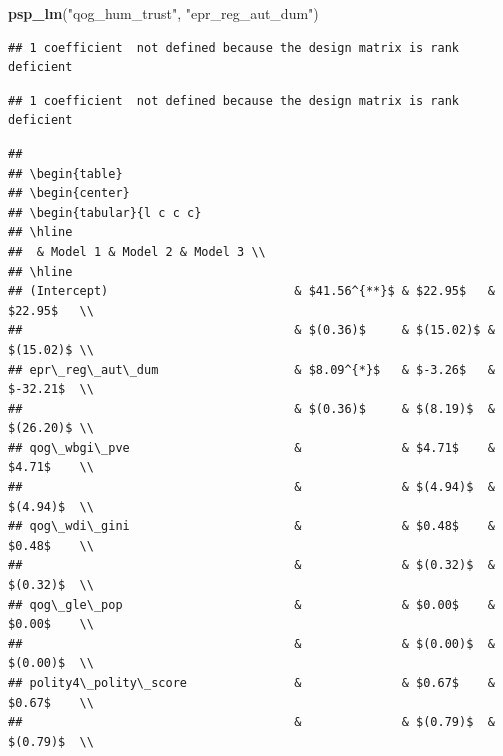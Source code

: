 \documentclass[
]{article}
\newenvironment{Shaded}{\begin{snugshade}}{\end{snugshade}}
\newcommand{\KeywordTok}[1]{\textcolor[rgb]{0.13,0.29,0.53}{\textbf{#1}}}
\newcommand{\NormalTok}[1]{#1}
\newcommand{\StringTok}[1]{\textcolor[rgb]{0.31,0.60,0.02}{#1}}
\begin{document}
\begin{Shaded}
\begin{Highlighting}[]
\KeywordTok{psp_lm}\NormalTok{(}\StringTok{"qog_hum_trust"}\NormalTok{, }\StringTok{"epr_reg_aut_dum"}\NormalTok{)}
\end{Highlighting}
\end{Shaded}

\begin{verbatim}
## 1 coefficient  not defined because the design matrix is rank deficient
\end{verbatim}

\begin{verbatim}
## 1 coefficient  not defined because the design matrix is rank deficient
\end{verbatim}

\begin{verbatim}
## 
## \begin{table}
## \begin{center}
## \begin{tabular}{l c c c}
## \hline
##  & Model 1 & Model 2 & Model 3 \\
## \hline
## (Intercept)                          & $41.56^{**}$ & $22.95$   & $22.95$   \\
##                                      & $(0.36)$     & $(15.02)$ & $(15.02)$ \\
## epr\_reg\_aut\_dum                   & $8.09^{*}$   & $-3.26$   & $-32.21$  \\
##                                      & $(0.36)$     & $(8.19)$  & $(26.20)$ \\
## qog\_wbgi\_pve                       &              & $4.71$    & $4.71$    \\
##                                      &              & $(4.94)$  & $(4.94)$  \\
## qog\_wdi\_gini                       &              & $0.48$    & $0.48$    \\
##                                      &              & $(0.32)$  & $(0.32)$  \\
## qog\_gle\_pop                        &              & $0.00$    & $0.00$    \\
##                                      &              & $(0.00)$  & $(0.00)$  \\
## polity4\_polity\_score               &              & $0.67$    & $0.67$    \\
##                                      &              & $(0.79)$  & $(0.79)$  \\

\end{verbatim}
\end{document}

